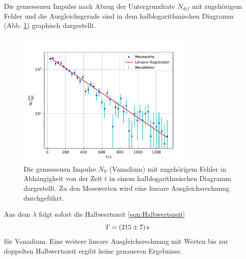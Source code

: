 Die gemessenen Impulse nach Abzug der Untergrundrate $N_{dif}$ mit zugehörigem Fehler und die Ausgleichsgerade sind in dem halblogarithmischen Diagramm (Abb. \ref{fig:vanadium_plot}) graphisch dargestellt.
\begin{figure}
    \centering
    \includegraphics[width=0.8\textwidth]{content/data/vanadium.pdf}
    \caption{Die gemessenen Impulse $N_V$ (Vanadium) mit zugehörigem Fehler in Abhängigkeit von der Zeit $t$ in einem halblogarithmischen Diagramm dargestellt. Zu den Messwerten wird eine lineare Ausgleichsrechnung durchgeführt. \cite{matplotlib} \cite{numpy} \cite{scipy} \cite{uncertainties}}
    \label{fig:vanadium_plot}
\end{figure}
Aus dem $\lambda$ folgt sofort die Halbwertszeit \eqref{eqn:Halbwertszeit}
\begin{equation}
    T = \SI{215+-7}{\second}
\end{equation}
für Vanadium.
Eine weitere lineare Ausgleichsrechnung mit Werten bis zur doppelten Halbwertszeit ergibt keine genaueren Ergebnisse.

